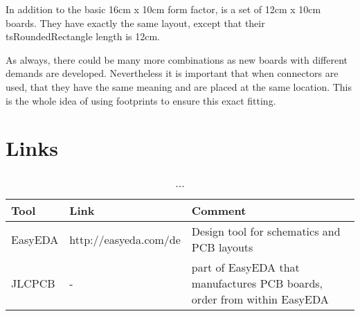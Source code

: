 In addition to the basic 16cm x 10cm form factor, is a set of 12cm x 10cm boards. They have exactly the same layout, except that their tsRoundedRectangle length is 12cm. 

\begin{figure}[ht]
    \centering
\end{figure}

\FloatBarrier

\begin{figure}[ht]
    \centering
\end{figure}

\FloatBarrier

\begin{figure}[ht]
    \centering
\end{figure}

\FloatBarrier

As always, there could be many more combinations as new boards with different demands are developed. Nevertheless it is important that when connectors are used, that they have the same meaning and are placed at the same location. This is the whole idea of using footprints to ensure this exact fitting.

\section{Links}

\begin{table}[!ht]
    \begin{center}
        \caption{...}
        \begin{tabular}{|l|l|p{}|}
            \toprule
            \textbf{Tool} & \textbf{Link} & \textbf{Comment} \\
            \midrule
            EasyEDA & http://easyeda.com/de & Design tool for schematics and PCB layouts \\
            \midrule
            JLCPCB & - & part of EasyEDA that manufactures PCB boards, order from within EasyEDA \\
            \bottomrule
        \end{tabular}
    \end{center}
\end{table}
